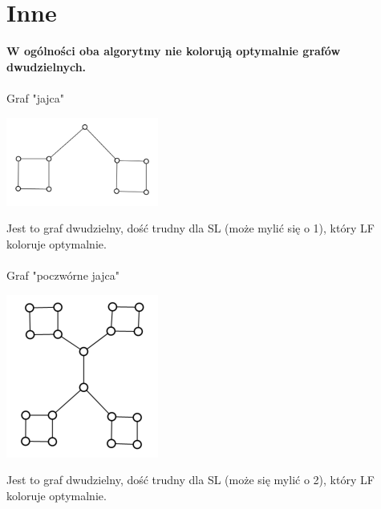 \documentclass{article}
\begin{document}
\section{Inne}
\textbf{W ogólności oba algorytmy nie kolorują optymalnie grafów dwudzielnych. }\\\\
Graf "jajca"
\begin{center}
\includegraphics[width = 5cm]{jajco}
\end{center}
Jest to graf dwudzielny,  dość trudny dla SL (może mylić się o 1), który LF koloruje optymalnie. \\\\
Graf "poczwórne jajca"
\begin{center}
\includegraphics[width=5cm]{czteryjaja}
\end{center}
Jest to graf dwudzielny, dość trudny dla SL (może się mylić o 2), który LF koloruje optymalnie. \\\\
\end{document}
